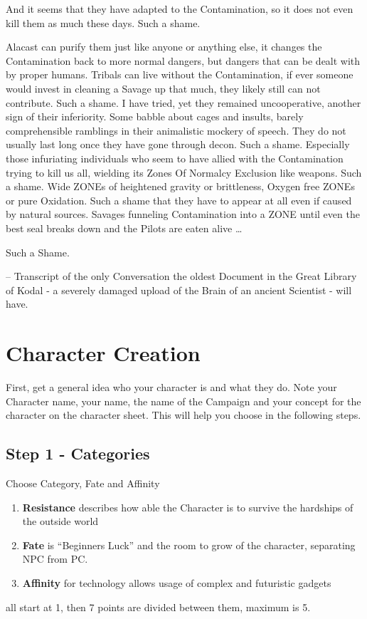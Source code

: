 \documentclass[a4paper]{book}
\begin{document}
    And it seems that they have adapted to the Contamination, so it does not even kill them as much these days.
    Such a shame. \par
    Alacast can purify them just like anyone or anything else,
    it changes the Contamination back to more normal dangers, but dangers that can be dealt with by proper humans.
    Tribals can live without the Contamination,
    if ever someone would invest in cleaning a Savage up that much, they likely still can not contribute.
    Such a shame.
    I have tried, yet they remained uncooperative, another sign of their inferiority.
    Some babble about cages and insults, barely comprehensible ramblings in their animalistic mockery of
    speech.
    They do not usually last long once they have gone through decon.
    Such a shame.
    Especially those infuriating individuals who seem to have allied with the Contamination trying to kill us all,
    wielding its Zones Of Normalcy Exclusion like weapons.
    Such a shame.
    Wide ZONEs of heightened gravity or brittleness, Oxygen free ZONEs or pure Oxidation.
    Such a shame that they have to appear at all even if caused by natural sources.
    Savages funneling Contamination into a ZONE  until even the best seal breaks down and the Pilots are eaten alive
    \ldots \par Such a Shame. \par \par
    -- Transcript of the only Conversation the oldest Document in the Great Library of Kodal - a severely damaged
    upload of the Brain of an ancient Scientist - will have.\newpage

    \chapter{Character Creation}\label{ch:charactercreation}
    First, get a general idea who your character is and what they do.
    Note your Character name, your name, the name of the
    Campaign and your concept for the character on the character sheet.
    This will help you choose in the following steps.

    \section{Step 1 - Categories}\label{sec:step1-categories}

    Choose Category, Fate and Affinity\par
    \begin{enumerate}
        \item \textbf{Resistance} describes how able the Character is to survive the hardships of the outside world
        \item \textbf{Fate} is ``Beginners Luck'' and the room to grow of the character, separating NPC from PC\@.
        \item \textbf{Affinity} for technology allows usage of complex and futuristic gadgets
    \end{enumerate}
    all start at 1, then 7 points are divided between them, maximum is 5.
\end{document}
